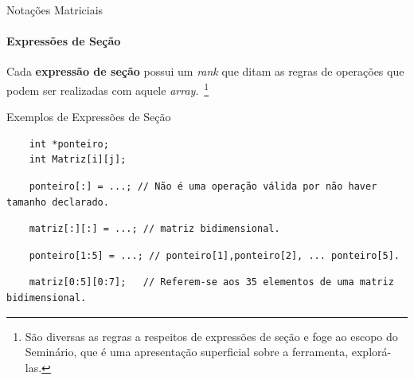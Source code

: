 \documentclass{beamer}
\begin{document}
\begin{frame}[fragile]{Notações Matriciais}
\framesubtitle{Expressões de Seção}
    Cada \textbf{expressão de seção} possui um \textit{rank} que ditam as regras de operações que
    podem ser realizadas com aquele \textit{array}.~\footnote{São diversas as
    regras a respeitos de expressões de seção e foge ao escopo do Seminário,
    que é uma apresentação superficial sobre a ferramenta, explorá-las.}
\begin{scriptsize}
\begin{block}{Exemplos de Expressões de Seção}
\begin{verbatim}
    int *ponteiro;
    int Matriz[i][j];
\end{verbatim}
\pause
\begin{verbatim}
    ponteiro[:] = ...; // Não é uma operação válida por não haver tamanho declarado.
\end{verbatim}
\pause
\begin{verbatim}
    matriz[:][:] = ...; // matriz bidimensional.
\end{verbatim}
\pause
\begin{verbatim}
    ponteiro[1:5] = ...; // ponteiro[1],ponteiro[2], ... ponteiro[5].
\end{verbatim}
\pause
\begin{verbatim}
    matriz[0:5][0:7]; 	// Referem-se aos 35 elementos de uma matriz bidimensional.
\end{verbatim}
\end{block}
\end{scriptsize}
\end{frame}
\end{document}
